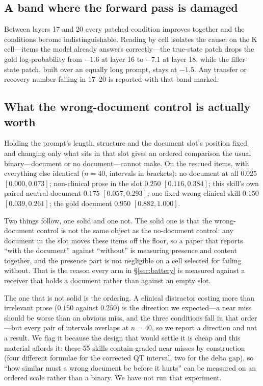 \documentclass{article}
\begin{document}
\subsection{A band where the forward pass is damaged}

Between layers 17 and 20 every patched condition improves together and the
conditions become indistinguishable. Reading by cell isolates the cause: on the
K cell---items the model already answers correctly---the true-state patch drops
the gold log-probability from $-1.6$ at layer 16 to $-7.1$ at layer 18, while
the filler-state patch, built over an equally long prompt, stays at $-1.5$. Any
transfer or recovery number falling in 17--20 is reported with that band marked.

\subsection{What the wrong-document control is actually worth}
\label{sec:plausible}


Holding the prompt's length, structure and the document slot's position fixed and
changing only what sits in that slot gives an ordered comparison the usual
binary---document or no document---cannot make. On the rescued items, with
everything else identical ($n=40$, intervals in brackets): no document at all
$0.025$ $[0.000, 0.073]$; non-clinical prose in the slot $0.250$
$[0.116, 0.384]$; this skill's own paired neutral document $0.175$
$[0.057, 0.293]$; one fixed wrong clinical skill $0.150$ $[0.039, 0.261]$; the
gold document $0.950$ $[0.882, 1.000]$.

Two things follow, one solid and one not. The solid one is that the
wrong-document control is not the same object as the no-document control: any
document in the slot moves these items off the floor, so a paper that reports
``with the document'' against ``without'' is measuring presence and content
together, and the presence part is not negligible on a cell selected for failing
without. That is the reason every arm in \S\ref{sec:battery} is measured against
a receiver that holds a document rather than against an empty slot.

The one that is not solid is the ordering. A clinical distractor costing more
than irrelevant prose ($0.150$ against $0.250$) is the direction we expected---a
near miss should be worse than an obvious miss, and the three conditions fall in
that order---but every pair of intervals overlaps at $n=40$, so we report a
direction and not a result. We flag it because the design that would settle it is cheap and
this material affords it: these 55 skills contain graded near misses by
construction (four different formulae for the corrected QT interval, two for the
delta gap), so ``how similar must a wrong document be before it hurts'' can be
measured on an ordered scale rather than a binary. We have not run that
experiment.
\end{document}
